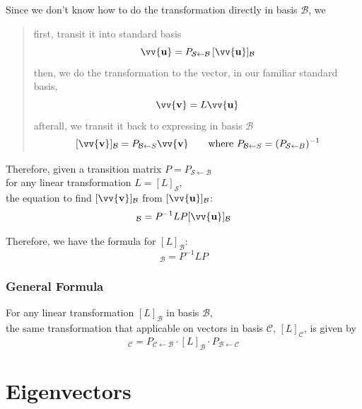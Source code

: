 \documentclass[11pt]{article}
\DeclareRobustCommand{\myvec}[1]{\vv{\mathbf{#1}}}
\newcommand{\myset}[1]{\mathcal{#1}}
\newcommand{\mymat}[1]{#1}
\begin{document}
    Since we don't know how to do the transformation directly in basis $\myset{B}$, we \\
    \begin{quote}
        first, transit it into standard basis
        \[ \myvec{u} = \mymat{P}_{\myset{S}\leftarrow\myset{B}}\,[\myvec{u}]_{\myset{B}} \]
        then, we do the transformation to the vector, in our familiar standard basis,
        \[ \myvec{v} = \mymat{L}\myvec{u} \]
        afterall, we transit it back to expressing in basis $\myset{B}$ \\
        \[ [\myvec{v}]_{\myset{B}} = \mymat{P}_{\myset{B}\leftarrow{S}} \myvec{v} \qquad \text{where } \mymat{P}_{\myset{B}\leftarrow{S}} = (\mymat{P}_{\myset{S}\leftarrow{B}})^{-1}\]
    \end{quote}
    Therefore, given a transition matrix $\mymat{P} = \mymat{P}_{\myset{S}\leftarrow\myset{B}}$ \\
    for any linear transformation $\mymat{L} = [\mymat{L}]_{\myset{S}}$,\\ 
    the equation to find $[\myvec{v}]_{\myset{B}}$ from $[\myvec{u}]_{\myset{B}}$:
    \begin{equation}
        [\myvec{v}]_{\myset{B}} = \mymat{P}^{-1} \mymat{L} \mymat{P} [\myvec{u}]_{\myset{B}}
    \end{equation}

    Therefore, we have the formula for $[\mymat{L}]_{\myset{B}}$:
    \begin{equation}
        [\mymat{L}]_{\myset{B}} = \mymat{P}^{-1} \mymat{L} \mymat{P}
    \end{equation}

    \subsubsection{General Formula}
    For any linear transformation $[\mymat{L}]_{\myset{B}}$ in basis $\myset{B}$, \\
    the same transformation that applicable on vectors in basis $\myset{C}$, $[\mymat{L}]_{\myset{C}}$, is given by
    \begin{equation}
        [\mymat{L}]_{\myset{C}} = \mymat{P}_{\myset{C}\leftarrow\myset{B}} \cdot [\mymat{L}]_{\myset{B}} \cdot \mymat{P}_{\myset{B}\leftarrow\myset{C}}
    \end{equation}
    
    \newpage
    \section{Eigenvectors}
\end{document}
